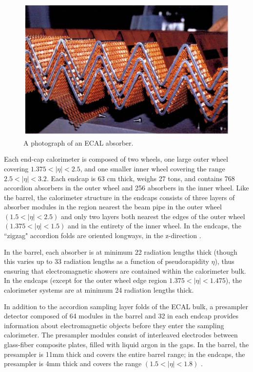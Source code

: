 \begin{figure}
  \includegraphics[width=\linewidth]{figures/detector_chapter/ECALphoto.png}
  \caption{A photograph of an ECAL absorber. \cite{KriegerECALphoto}}
  \label{fig:ECALphoto}
\end{figure}

Each end-cap calorimeter is composed of two wheels, one large outer wheel covering $ 1.375<| \eta |<2.5 $, and one smaller inner wheel covering the range $ 2.5<| \eta |<3.2 $. Each endcap is 63 cm thick, weighs 27 tons, and contains 768 accordion absorbers in the outer wheel and 256 absorbers in the inner wheel. Like the barrel, the calorimeter structure in the endcaps consists of three layers of absorber modules in the region nearest the beam pipe in the outer wheel $( 1.5 < |\eta | <2.5 )$ and only two layers both nearest the edges of the outer wheel $(1.375 < |\eta | < 1.5)$ and in the entirety of the inner wheel. In the endcaps, the ``zigzag" accordion folds are oriented longways, in the z-direction \cite{Discussion}.

In the barrel, each absorber is at minimum 22 radiation lengths thick (though this varies up to 33 radiation lengths as a function of pseudorapidity $\eta$), thus ensuring that electromagnetic showers are contained within the calorimeter bulk. In the endcaps (except for the outer wheel edge region  $ 1.375< | \eta |< 1.475 $), the calorimeter systems are at minimum 24 radiation lengths thick.

In addition to the accordion sampling layer folds of the ECAL bulk, a presampler detector composed of 64 modules in the barrel and 32 in each endcap provides information about electromagnetic objects before they enter the sampling calorimeter. The presampler modules consist of interleaved electrodes between glass-fiber composite plates, filled with liquid argon in the gaps. In the barrel, the presampler is 11mm thick and covers the entire barrel range; in the endcaps, the presampler is 4mm thick and covers the range $(1.5<| \eta |<1.8)$ \cite{Presampler}.

